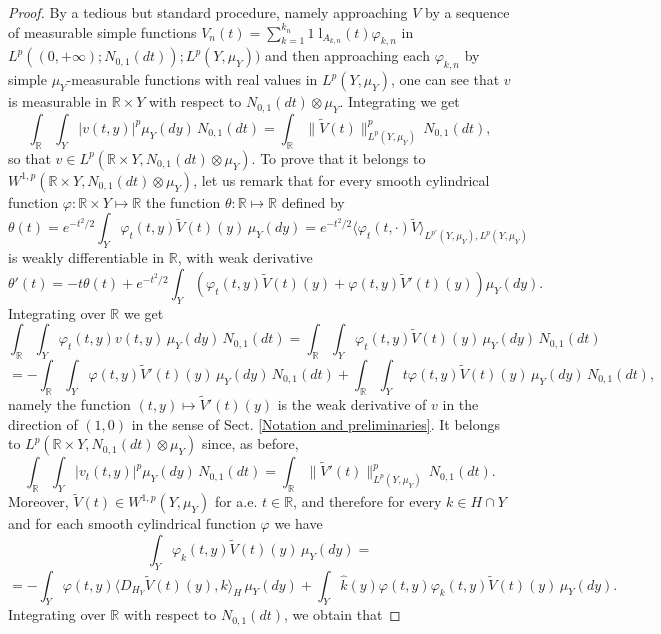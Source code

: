 \documentclass[reqno,twoside,12pt]{amsart}
\begin{document}
\begin{proof}
By a tedious but standard procedure, namely approaching $V$ by a sequence of measurable simple functions 
$V_n(t) = \sum_{k=1}^{k_n} {1\!\!\!\;\mathrm{l}}_{A_{k,n}}(t) \varphi_{k,n}$ in $L^p((0, +\infty); N_{0,1}(dt)); L^p(Y, \mu_Y))$ and then 
approaching each $ \varphi_{k,n}$ by simple $\mu_Y$-measurable functions with real values in $L^p(Y, \mu_Y)$, one can see that $v$ is measurable in ${\mathbb R} \times Y$ with respect to $N_{0,1}(dt) \otimes  \mu_Y$. Integrating we get 
$$\int_ {\mathbb R} \int_Y |v(t,y)|^p  \mu_Y(dy) \,N_{0,1}(dt) = \int_{\mathbb R}\|\widetilde{V}(t )\|^p_{L^p(Y, \mu_Y)}   \,N_{0,1}(dt),$$
so that $v\in L^p({\mathbb R} \times Y,N_{0,1}(dt) \otimes  \mu_Y)$. To prove that it belongs to $W^{1,p}({\mathbb R} \times Y,N_{0,1}(dt) \otimes  \mu_Y)$, let us remark that for every smooth cylindrical function $\varphi: {\mathbb R} \times Y\mapsto {\mathbb R}$ the function $\theta :{\mathbb R}\mapsto {\mathbb R}$ defined by
$$\theta (t) = e^{-t^2/2} \int_Y \varphi_t(t,y)\widetilde{V}(t )(y)\,  \mu_Y(dy) =  e^{-t^2/2} \langle \varphi_t(t,\cdot )\widetilde{V}\rangle _{L^{p'}(Y, \mu_Y), L^{p}(Y, \mu_Y)}$$
is weakly differentiable in ${\mathbb R}$, with weak derivative 
$$\theta'(t) = -t \theta(t) + e^{-t^2/2}\int_Y (\varphi_t(t,y)\widetilde{V}(t )(y)+ \varphi(t,y)\widetilde{V}'(t )(y)) \mu_Y(dy) .$$
Integrating over ${\mathbb R}$ we get 
$$\int_{\mathbb R}\int_Y \varphi_t(t,y) v(t,y)\,  \mu_Y(dy) \,N_{0,1}(dt) = \int_{\mathbb R}\int_Y\varphi_t(t,y)\widetilde{V}(t )(y)\,  \mu_Y(dy) \,N_{0,1}(dt) $$
$$ =  -\int_{\mathbb R} \int_Y \varphi(t,y)\widetilde{V}'(t )(y)\,  \mu_Y(dy) \,N_{0,1}(dt) + \int_{\mathbb R} \int_Y t\varphi(t,y)\widetilde{V}(t )(y)\,  \mu_Y(dy) \,N_{0,1}(dt),  $$
namely the function $(t,y) \mapsto  \widetilde{V}'(t )(y)$ is the weak derivative of $v$ in the direction of $(1,0)$ in the sense of 
Sect. \ref{Notation and preliminaries}. It  belongs to $L^p({\mathbb R} \times Y,N_{0,1}(dt) \otimes  \mu_Y)$ since, as before, 
$$\int_ {\mathbb R} \int_Y |v_t(t,y)|^p  \mu_Y(dy) \,N_{0,1}(dt) = \int_{\mathbb R}\|\widetilde{V}'(t )\|^p_{L^p(Y, \mu_Y)}   \,N_{0,1}(dt).$$
Moreover, $\widetilde{V} (t )\in W^{1,p}(Y, \mu_Y)$ for a.e. $t\in {\mathbb R}$, and therefore for every $k\in H\cap Y$ and for each smooth cylindrical function $\varphi$ we have
$$\int_Y \varphi_k(t,y)\widetilde{V} (t )(y)\,\mu_Y(dy) =$$
$$= -\int_Y \varphi(t,y)   \langle D_{H_Y}\widetilde{V}(t )(y), k\rangle_H\,\mu_Y(dy) + \int_Y \hat{k}(y)\varphi(t,y)   \varphi_k(t,y)\widetilde{V} (t )(y)\,\mu_Y(dy). $$
Integrating over ${\mathbb R}$ with respect to $N_{0,1}(dt)$, we obtain that 

\end{proof}
\end{document}

